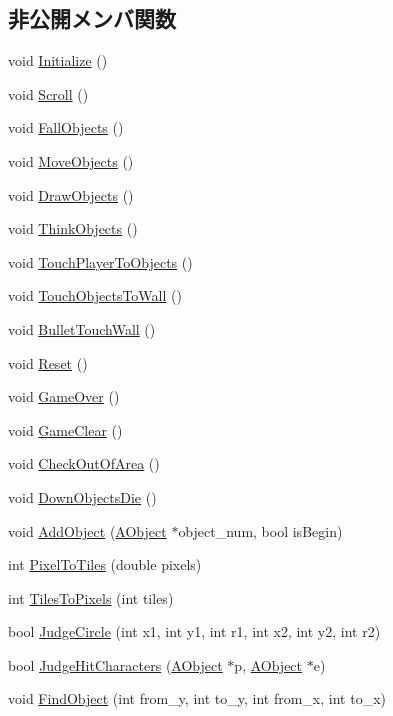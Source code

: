 \subsection*{非公開メンバ関数}
\begin{DoxyCompactItemize}
\item 
void \hyperlink{class_field_a1eda9df5b8cb72839ed042921025fb65}{Initialize} ()
\item 
void \hyperlink{class_field_a433cb83e730fd4ed4c773fb3eb32919c}{Scroll} ()
\item 
void \hyperlink{class_field_aab548ccb15ba5e71cd81880a40fcb1c2}{Fall\+Objects} ()
\item 
void \hyperlink{class_field_a5b46210e4fa643128ce37b654f5eea90}{Move\+Objects} ()
\item 
void \hyperlink{class_field_a1addadd366450a3d89a09213b354cbde}{Draw\+Objects} ()
\item 
void \hyperlink{class_field_a9fdfb39458b7f28b0084ff4f0ba306ab}{Think\+Objects} ()
\item 
void \hyperlink{class_field_a527bab59bc982d71e31d08a8f19012a2}{Touch\+Player\+To\+Objects} ()
\item 
void \hyperlink{class_field_a9e2f9ec9dea92779d4ad10ef5317c9bd}{Touch\+Objects\+To\+Wall} ()
\item 
void \hyperlink{class_field_a68718c2c362cb7586112993c765306af}{Bullet\+Touch\+Wall} ()
\item 
void \hyperlink{class_field_aa0d2a42df398cb284aded394edd765ca}{Reset} ()
\item 
void \hyperlink{class_field_a95aed395fb1b9c1d771adb49147387a3}{Game\+Over} ()
\item 
void \hyperlink{class_field_aff3490dddeee21254efb211a535d9c78}{Game\+Clear} ()
\item 
void \hyperlink{class_field_aa099cc4ccf2b6e467484b98cf1d56cb6}{Check\+Out\+Of\+Area} ()
\item 
void \hyperlink{class_field_a3d208f24dd94f42d9ed7a4e63bf34a3c}{Down\+Objects\+Die} ()
\item 
void \hyperlink{class_field_a4a204b53b4884c14eafae7ce359155ce}{Add\+Object} (\hyperlink{class_a_object}{A\+Object} $\ast$object\+\_\+num, bool is\+Begin)
\item 
int \hyperlink{class_field_a36e491f48f9b23b6a165d264babdb2fd}{Pixel\+To\+Tiles} (double pixels)
\item 
int \hyperlink{class_field_ab2167aa053c1d17f8dcfecb47c9acdd2}{Tiles\+To\+Pixels} (int tiles)
\item 
bool \hyperlink{class_field_ab073fa1f34ae99052a1525fb63299b3d}{Judge\+Circle} (int x1, int y1, int r1, int x2, int y2, int r2)
\item 
bool \hyperlink{class_field_a6b4cbd035716adc939657108e0575186}{Judge\+Hit\+Characters} (\hyperlink{class_a_object}{A\+Object} $\ast$p, \hyperlink{class_a_object}{A\+Object} $\ast$e)
\item 
void \hyperlink{class_field_a60fc25acdab8f888ee7791c6f32318ab}{Find\+Object} (int from\+\_\+y, int to\+\_\+y, int from\+\_\+x, int to\+\_\+x)
\end{DoxyCompactItemize}
